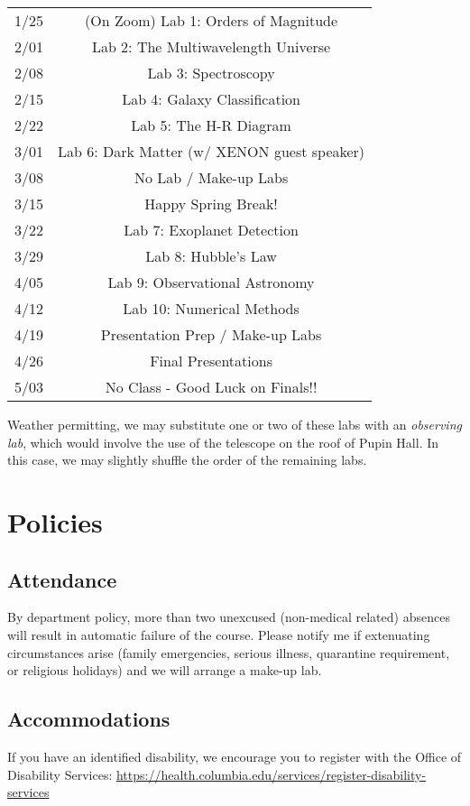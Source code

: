\documentclass[11pt]{article}
\begin{document}
\begin{tabular}{cc}
    1/25 & (On Zoom) Lab 1: Orders of Magnitude\\
    2/01 & Lab 2: The Multiwavelength Universe\\
    2/08 & Lab 3: Spectroscopy\\
    2/15 & Lab 4: Galaxy Classification\\
    2/22 & Lab 5: The H-R Diagram\\
    3/01 & Lab 6: Dark Matter (w/ XENON guest speaker)\\
    3/08 & No Lab / Make-up Labs\\
    3/15 & Happy Spring Break!\\
    3/22 & Lab 7: Exoplanet Detection\\
    3/29 & Lab 8: Hubble's Law\\
    4/05 & Lab 9: Observational Astronomy\\
    4/12 & Lab 10: Numerical Methods\\
    4/19 & Presentation Prep / Make-up Labs\\
    4/26 & Final Presentations\\
    5/03 & No Class - Good Luck on Finals!!
\end{tabular}
\bigskip

Weather permitting, we may substitute one or two of these labs with an \emph{observing lab}, which would involve the use of the telescope on the roof of Pupin Hall. In this case, we may slightly shuffle the order of the remaining labs.

\section*{Policies}
 
\subsection*{Attendance}
 
By department policy, more than two unexcused (non-medical related) absences will result in automatic failure of the course. Please notify me if  extenuating circumstances arise (family emergencies, serious illness, quarantine requirement, or religious holidays) and we will arrange a make-up lab.
 
\subsection*{Accommodations}
If you have an identified disability, we encourage you to register with the Office of Disability Services: \url{https://health.columbia.edu/services/register-disability-services}
 
\end{document}
